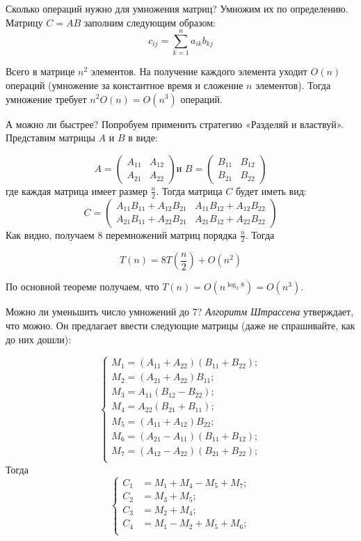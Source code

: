 \documentclass[a4paper,12pt]{article}
\begin{document}
Сколько операций нужно для умножения матриц? Умножим их по определению. Матрицу
\(C = AB\) заполним следующим образом:
\[c_{ij} = \sum\limits_{k = 1}^{n} a_{ik}b_{kj}\]

Всего в матрице \(n^2\) элементов. На получение каждого элемента уходит \(O(n)\) операций (умножение за константное время и сложение \(n\) элементов). Тогда умножение требует \(n^2O(n) = O(n^3)\)
операций.

А можно ли быстрее? Попробуем применить стратегию «Разделяй и властвуй». Представим
матрицы \(A\) и \(B\) в виде:

\[A = \begin{pmatrix}
A_{11} & A_{12}\\
A_{21} & A_{22}
\end{pmatrix}
\text{и } 
B = \begin{pmatrix}
B_{11} & B_{12}\\
B_{21} & B_{22}
\end{pmatrix}\]
где каждая матрица имеет размер \(\frac{n}{2}\). Тогда матрица \(C\) будет иметь вид:
\[C = \begin{pmatrix}
A_{11}B_{11}+A_{12}B_{21} & A_{11}B_{12}+A_{12}B_{22}\\
A_{21}B_{11}+A_{22}B_{21} & A_{21}B_{12}+A_{22}B_{22}
\end{pmatrix}\]
 Как видно, получаем 8 перемножений матриц порядка \(\frac{n}{2}\). Тогда

\[T(n) = 8T\left( \frac{n}{2} \right) + O(n^2)\]

По основной теореме получаем, что $T(n) = O\left(n^{\log_{2} 8}\right) = O(n^{3})$.

Можно ли уменьшить число умножений до 7? \emph{Алгоритм Штрассена} утверждает, что можно. Он предлагает ввести следующие матрицы (даже не спрашивайте, как до них дошли):

\[\begin{cases}
    M_1 = (A_{11} + A_{22})(B_{11} + B_{22}); \\
    M_2 = (A_{21} + A_{22})B_{11}; \\
    M_3 = A_{11}(B_{12} - B_{22}); \\
    M_4 = A_{22}(B_{21} + B_{11}); \\
    M_5 = (A_{11} + A_{12})B_{22}; \\
    M_6 = (A_{21} - A_{11})(B_{11} + B_{12}); \\
    M_7 = (A_{12} - A_{22})(B_{21} + B_{22}); \\
\end{cases}\]
Тогда
\[\begin{cases}
    C_1 &= M_1+M_4-M_5+M_7; \\
    C_2 &= M_3+M_5; \\
    C_3 &= M_2+M_4; \\
    C_4 &= M_1-M_2+M_5+M_6; \\
\end{cases}\]
\end{document}
